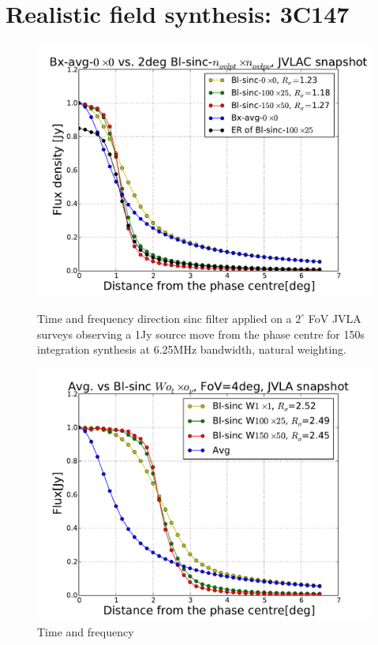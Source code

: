 \documentclass[useAMS,usenatbib]{mn2e}
\begin{document}
\section{Realistic field synthesis: 3C147}
 \begin{figure}
    \centering
  \begin{minipage}{0.38\linewidth}\includegraphics[width=1\textwidth]{./Figures/Bl-sinc-FoV2-vla.pdf}\caption{Time and frequency 
  direction sinc filter applied on a $2^{\circ}$ FoV JVLA surveys observing a 1Jy source move from the phase centre for 150s integration 
  synthesis at 6.25MHz bandwidth, natural weighting.}\label{fig:Bl-sinc-FoV2}\end{minipage}
  \hspace{1cm}
  \begin{minipage}{0.38\linewidth}\includegraphics[width=1\textwidth]{./Figures/Bl-sinc-FoV4-vla.pdf}\caption{Time and frequency 
}
\end{minipage}
\end{figure}
\end{document}
